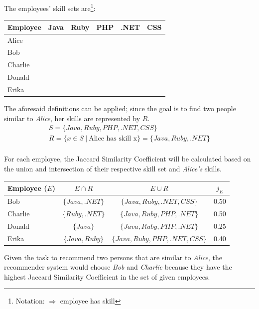 The employees' skill sets are\footnote{Notation: \checkmark $\Rightarrow$ employee has skill}:
\begin{center}
\begin{tabular}{l||c|c|c|c|c}
	Employee & Java & Ruby & PHP & .NET & CSS \\
	\hline
	Alice    & \checkmark & \checkmark &            & \checkmark &            \\
	Bob      & \checkmark &            &            & \checkmark & \checkmark \\
	Charlie  &            & \checkmark & \checkmark & \checkmark &            \\
	Donald   & \checkmark &            & \checkmark &            &            \\
	Erika    & \checkmark & \checkmark & \checkmark &            & \checkmark \\
\end{tabular}
\end{center}

The aforesaid definitions can be applied; since the goal is to find two people similar to \textit{Alice}, her skills are represented by $R$.
\begin{gather*}
	S = \{Java, Ruby, PHP, .NET, CSS\} \\
	R = \{x \in S \ | \ \textrm{Alice has skill x}\} = \{ Java, Ruby, .NET \}\\
\end{gather*}

For each employee, the Jaccard Similarity Coefficient will be calculated based on the union and intersection of their respective skill set and \textit{Alice's} skills.
\begin{center}
\begin{tabular}{l||c|c||c}
	Employee ($E$) & $E \cap R$ & $E \cup R$ & $j_E$ \\
	\hline
	Bob            & $\{Java, .NET\}$ & $\{Java, Ruby, .NET, CSS\}$ & 0.50 \\
	Charlie        & $\{Ruby, .NET\}$ & $\{Java, Ruby, PHP, .NET\}$ & 0.50 \\
	Donald         & $\{Java\}$ & $\{Java, Ruby, PHP, .NET\}$ & 0.25\\
	Erika          & $\{Java, Ruby\}$ & $\{Java, Ruby, PHP, .NET, CSS\}$ & 0.40\\
\end{tabular}
\end{center}

Given the task to recommend two persons that are similar to \textit{Alice}, the recommender system would choose \textit{Bob} and \textit{Charlie} because they have the highest Jaccard Similarity Coefficient in the set of given employees.


